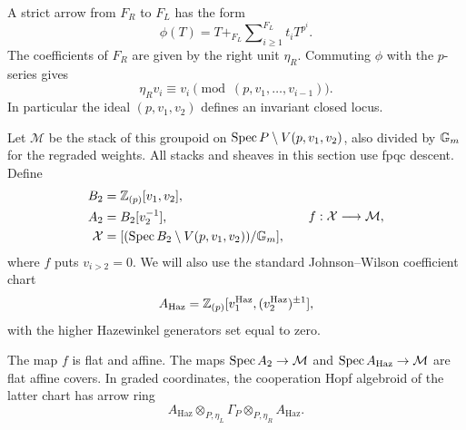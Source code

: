 A strict arrow from $F_R$ to $F_L$ has the form
\[
 \phi(T)=T+_{F_L}\mathop{\textstyle\sum}\nolimits_{i\geq1}^{F_L}
                      t_iT^{p^i}.
\]
The coefficients of $F_R$ are given by the right unit $\eta_R$.
Commuting $\phi$ with the $p$-series gives
\begin{equation}\label{geom:invariant-ideals}
 \eta_Rv_i\equiv v_i\pmod{(p,v_1,\ldots,v_{i-1})}.
\end{equation}
In particular the ideal $(p,v_1,v_2)$ defines an invariant closed locus.

Let $\mathcal M$ be the stack of this groupoid on
$\operatorname{Spec} P\setminus V(p,v_1,v_2)$, also divided by $\mathbb G_m$ for the
regraded weights.  All stacks and sheaves in this section use fpqc
descent.  Define
\[
 \begin{aligned}
 B_2&=\mathbb Z_{(p)}[v_1,v_2],\\
 A_2&=B_2[v_2^{-1}],\\
 \mathcal X&=[(\operatorname{Spec} B_2\setminus V(p,v_1,v_2))/\mathbb G_m],
 \end{aligned}
 \qquad f:\mathcal X\longrightarrow\mathcal M,
\]
where $f$ puts $v_{i>2}=0$.  We will also use the standard
Johnson--Wilson coefficient chart
\[
 A_{\mathrm{Haz}}
 =\mathbb Z_{(p)}[v_1^{\mathrm{Haz}},(v_2^{\mathrm{Haz}})^{\pm1}],
\]
with the higher Hazewinkel generators set equal to zero.

\begin{proposition}\label{geom:law-charts}
The map $f$ is flat and affine.  The maps
$\operatorname{Spec} A_2\to\mathcal M$ and
$\operatorname{Spec} A_{\mathrm{Haz}}\to\mathcal M$ are flat affine covers.
In graded coordinates, the cooperation Hopf algebroid of the latter
chart has arrow ring
\[
 A_{\mathrm{Haz}}\otimes_{P,\eta_L}\Gamma_P
                  \otimes_{P,\eta_R}A_{\mathrm{Haz}}.
\]
\end{proposition}

